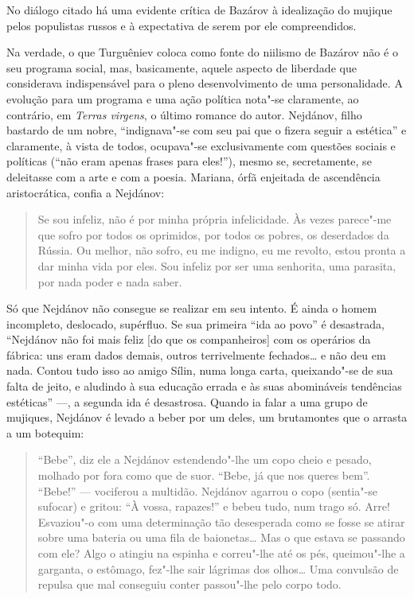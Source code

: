 No diálogo citado há uma evidente crítica de Bazárov à idealização do
mujique pelos populistas russos e à expectativa de serem por ele
compreendidos.

Na verdade, o que Turguêniev coloca como fonte do niilismo de
Bazárov não é o seu programa social, mas, basicamente, aquele aspecto
de liberdade que considerava indispensável para o pleno desenvolvimento
de uma personalidade. A evolução para um programa e uma ação política
nota"-se claramente, ao contrário, em \emph{Terras virgens}, o último
romance do autor. Nejdánov, filho bastardo de um nobre, ``indignava"-se
com seu pai que o fizera seguir a estética'' e claramente, à vista de
todos, ocupava"-se exclusivamente com questões sociais e políticas (``não
eram apenas frases para eles!''), mesmo se, secretamente, se deleitasse
com a arte e com a poesia. Mariana, órfã enjeitada de ascendência
aristocrática, confia a Nejdánov:

\begin{quotation}
Se sou infeliz, não é por minha própria infelicidade. Às vezes parece"-me que sofro por todos os oprimidos, por todos os pobres, os deserdados da Rússia. Ou melhor, não sofro, eu me indigno, eu me revolto, estou pronta a dar minha vida por eles. Sou infeliz por ser uma senhorita, uma parasita, por nada poder e nada saber.
\end{quotation}

Só que Nejdánov não consegue se realizar em seu intento. É ainda o homem incompleto, deslocado, supérfluo. Se sua primeira ``ida ao povo'' é desastrada, ``Nejdánov não foi mais feliz [do que os companheiros] com os operários da fábrica: uns eram dados demais, outros terrivelmente fechados\ldots{} e não deu em nada. Contou tudo isso ao amigo Sílin, numa longa carta, queixando"-se de sua falta de jeito, e aludindo à sua educação errada e às suas abomináveis tendências estéticas'' ---, a segunda ida é desastrosa. Quando ia falar a uma grupo de mujiques, Nejdánov é levado a beber por um deles, um brutamontes que o arrasta a um botequim:

\begin{quotation}
``Bebe'', diz ele a Nejdánov estendendo"-lhe um copo cheio e pesado, molhado por fora como que de suor. ``Bebe, já que nos queres bem''. ``Bebe!'' --- vociferou a multidão. Nejdánov agarrou o copo (sentia"-se sufocar) e gritou: ``À vossa, rapazes!'' e bebeu tudo, num trago só. Arre! Esvaziou"-o com uma determinação tão desesperada como se fosse se atirar sobre uma bateria ou uma fila de baionetas\ldots{} Mas o que estava se passando com ele? Algo o atingiu na espinha e correu"-lhe até os pés, queimou"-lhe a
garganta, o estômago, fez"-lhe sair lágrimas dos olhos\ldots{} Uma convulsão de repulsa que mal conseguiu conter passou"-lhe pelo corpo todo.
\end{quotation}

